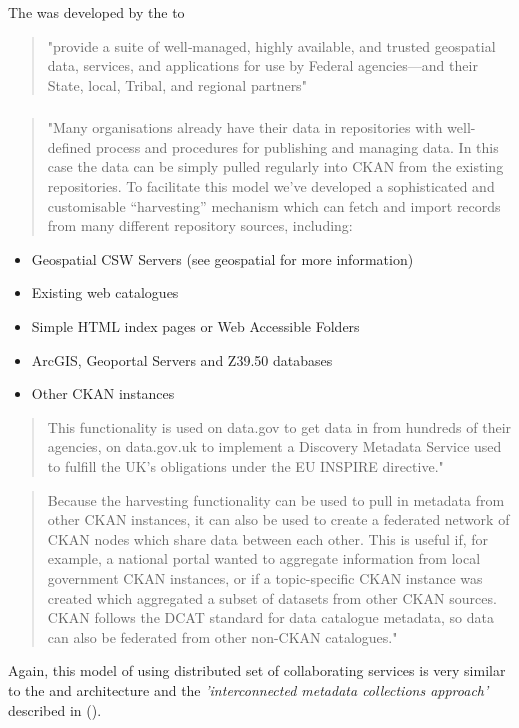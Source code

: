 \documentclass{article}
\begin{document}
The  was developed by the  to
\begin{quote}
"provide a suite of well‐managed, highly available, and trusted geospatial 
data, services, and applications for use by Federal agencies—and their State,
local, Tribal, and regional partners"
\end{quote}



\subsubsection{}

\begin{quote}
"Many organisations already have their data in repositories with well-defined process and procedures
for publishing and managing data. In this case the data can be simply pulled regularly into CKAN
from the existing repositories. To facilitate this model we’ve developed a sophisticated and
customisable “harvesting” mechanism which can fetch and import records from many different
repository sources, including:
\end{quote}

\begin{itemize}
\item Geospatial CSW Servers (see geospatial for more information)
\item Existing web catalogues
\item Simple HTML index pages or Web Accessible Folders
\item ArcGIS, Geoportal Servers and Z39.50 databases
\item Other CKAN instances
\end{itemize}

\begin{quote}
This functionality is used on data.gov to get data in from hundreds of their agencies,
on data.gov.uk to implement a Discovery Metadata Service used to fulfill the UK’s
obligations under the EU INSPIRE directive."
\end{quote}

\begin{quote}
Because the harvesting functionality can be used to pull in metadata from other CKAN instances,
it can also be used to create a federated network of CKAN nodes which share data between each other.
This is useful if, for example, a national portal wanted to aggregate information from local
government CKAN instances, or if a topic-specific CKAN instance was created which aggregated
a subset of datasets from other CKAN sources. CKAN follows the DCAT standard for data catalogue
metadata, so data can also be federated from other non-CKAN catalogues." 
\end{quote}

Again, this model of using distributed set of collaborating services is very similar to the
\cite{ivao} and \cite{astro} architecture and the \textit{'interconnected metadata collections approach'}
described in  (\cite{jones-2006}).





%
%

\printbibliography
\end{document}
